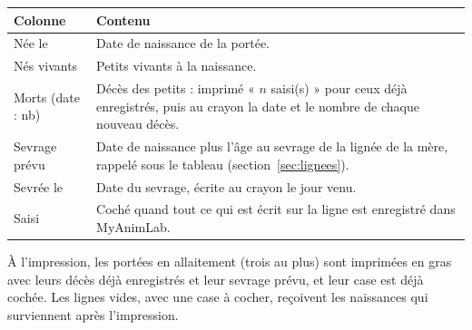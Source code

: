 \documentclass[11pt,a4paper]{article}
\begin{document}
\begin{center}
\small
{}
\begin{tabularx}{\textwidth}{@{}lX@{}}
\toprule
\textbf{Colonne} & \textbf{Contenu}\\
\midrule
Née le & Date de naissance de la portée.\\
Nés vivants & Petits vivants à la naissance.\\
Morts (date : nb) & Décès des petits : imprimé « $n$ saisi(s) » pour ceux déjà enregistrés, puis au crayon la date et le nombre de chaque nouveau décès.\\
Sevrage prévu & Date de naissance plus l'âge au sevrage de la lignée de la mère, rappelé sous le tableau (section~\ref{sec:lignees}).\\
Sevrée le & Date du sevrage, écrite au crayon le jour venu.\\
Saisi & Coché quand tout ce qui est écrit sur la ligne est enregistré dans MyAnimLab.\\
\bottomrule
\end{tabularx}
\end{center}

À l'impression, les portées en allaitement (trois au plus) sont imprimées en
gras avec leurs décès déjà enregistrés et leur sevrage prévu, et leur case
 est déjà cochée. Les lignes vides, avec une case à cocher,
reçoivent les naissances qui surviennent après l'impression.
\end{document}
